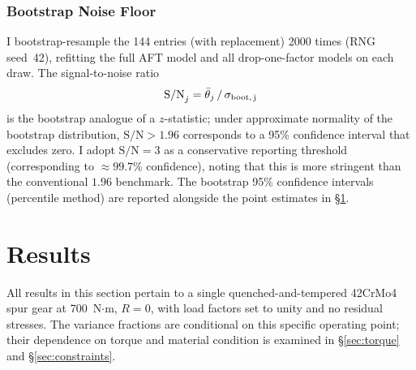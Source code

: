\documentclass[12pt,a4paper]{article}
\begin{document}
\subsubsection{Bootstrap Noise Floor}

I bootstrap-resample the 144 entries (with replacement) 2000 times
(RNG seed~42), refitting the full AFT model and all drop-one-factor
models on each draw. The signal-to-noise ratio
\begin{equation}
\mathrm{S/N}_j = \bar{\theta}_j \,/\, \sigma_{\rm boot,\,j}
\label{eq:snr}
\end{equation}
is the
bootstrap analogue of a $z$-statistic; under approximate normality
of the bootstrap distribution, $\mathrm{S/N} > 1.96$ corresponds to
a 95\% confidence interval that excludes zero. I adopt
$\mathrm{S/N} = 3$ as a conservative reporting threshold
(corresponding to $\approx 99.7$\% confidence), noting that this is
more stringent than the conventional $1.96$ benchmark. The bootstrap
95\% confidence intervals (percentile method) are reported alongside
the point estimates in \S\ref{sec:results}.

\section{Results}
\label{sec:results}

All results in this section pertain to a single quenched-and-tempered
42CrMo4 spur gear at 700~N$\cdot$m, $R=0$, with load factors set to
unity and no residual stresses. The variance fractions are conditional
on this specific operating point; their dependence on torque and
material condition is examined in \S\ref{sec:torque} and
\S\ref{sec:constraints}.
\end{document}
